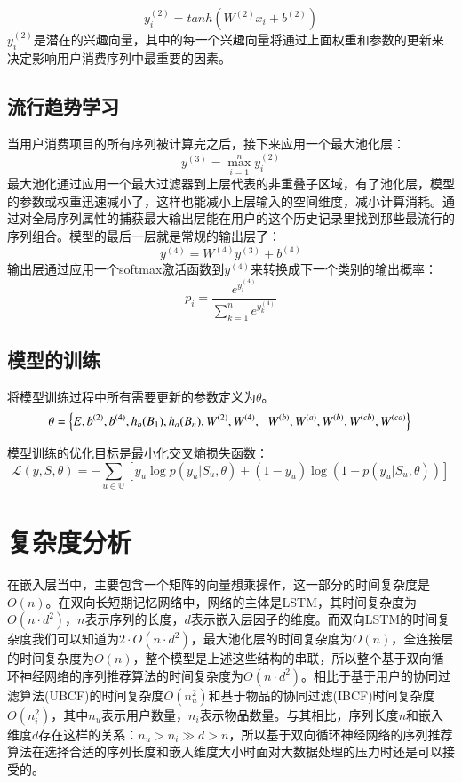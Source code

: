 $$
y_{i}^{(2)}=tanh(W^{(2)}x_{i}+b^{(2)})
$$
$y_{i}^{(2)}$是潜在的兴趣向量，其中的每一个兴趣向量将通过上面权重和参数的更新来决定影响用户消费序列中最重要的因素。

\subsection{流行趋势学习}
当用户消费项目的所有序列被计算完之后，接下来应用一个最大池化层：
$$
y^{(3)}=\max_{i=1}^{n}y_{i}^{(2)}
$$
最大池化通过应用一个最大过滤器到上层代表的非重叠子区域，有了池化层，模型的参数或权重迅速减小了，这样也能减小上层输入的空间维度，减小计算消耗。通过对全局序列属性的捕获最大输出层能在用户的这个历史记录里找到那些最流行的序列组合。模型的最后一层就是常规的输出层了：
$$
y^{(4)}=W^{(4)}y^{(3)}+b^{(4)}
$$
输出层通过应用一个softmax激活函数到$y^{(4)}$来转换成下一个类别的输出概率：
$$
p_{i}= \frac{e^{y_{i}^{(4)}}}{\sum_{k=1}^{n}e^{y_{k}^{(4)}}}
$$

\subsection{模型的训练}

将模型训练过程中所有需要更新的参数定义为$\theta $。
\begin{equation}
\theta=  \left \{ E,b^{(2)},b^{(4)},h_{b}(B_{1}),h_{a}(B_{n}),W^{(2)}, W^{(4)},\right.\\
\left.W^{(b)},W^{(a)},W^{(b)},W^{(cb)},W^{(ca)} \right \} \\
\end{equation}

模型训练的优化目标是最小化交叉熵损失函数：
\begin{equation}
\mathcal{L}(y,S,\theta )=-\sum_{u\in \mathbb{U}}[y_{u}\log p(y_{u}|S_{u},\theta)+(1-y_{u})\log (1-p(y_{u}|S_{u},\theta ))]
\end{equation}


\section{复杂度分析}
在嵌入层当中，主要包含一个矩阵的向量想乘操作，这一部分的时间复杂度是$O(n)$。在双向长短期记忆网络中，网络的主体是LSTM，其时间复杂度为$O(n\cdot d^{2})$，$n$表示序列的长度，$d$表示嵌入层因子的维度。而双向LSTM的时间复杂度我们可以知道为$2\cdot O(n\cdot d^{2})$，最大池化层的时间复杂度为$O(n)$，全连接层的时间复杂度为$O(n)$，整个模型是上述这些结构的串联，所以整个基于双向循环神经网络的序列推荐算法的时间复杂度为$O(n\cdot d^{2})$。相比于基于用户的协同过滤算法(UBCF)的时间复杂度$O(n_{u}^{2})$和基于物品的协同过滤(IBCF)时间复杂度$O(n_{i}^{2})$，其中$n_{u}$表示用户数量，$n_{i}$表示物品数量。与其相比，序列长度$n$和嵌入维度$d$存在这样的关系：$n_{u}> n_{i}\gg d> n$，所以基于双向循环神经网络的序列推荐算法在选择合适的序列长度和嵌入维度大小时面对大数据处理的压力时还是可以接受的。

